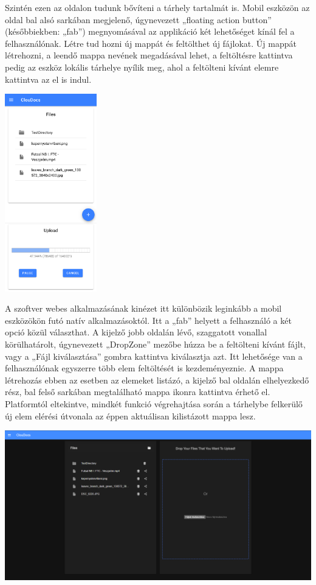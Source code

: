 \documentclass[12pt]{report}
\begin{document}
Szintén ezen az oldalon tudunk bővíteni a tárhely tartalmát is. Mobil eszközön az oldal bal alsó sarkában megjelenő, úgynevezett „floating action button” (későbbiekben: „fab”) megnyomásával az applikáció két lehetőséget kínál fel a felhasználónak. Létre tud hozni új mappát és feltölthet új fájlokat. Új mappát létrehozni, a leendő mappa nevének megadásával lehet, a feltöltésre kattintva pedig az eszköz lokális tárhelye nyílik meg, ahol a feltölteni kívánt elemre kattintva az el is indul.

\begin{center}
	\includegraphics[width=40mm,scale=0.5,]{upload.png}
\end{center}

A szoftver webes alkalmazásának kinézet itt különbözik leginkább a mobil eszközökön futó natív alkalmazásoktól. Itt a „fab” helyett a felhasználó a két opció közül választhat. A kijelző jobb oldalán lévő, szaggatott vonallal körülhatárolt, úgynevezett „DropZone” mezőbe húzza be a feltölteni kívánt fájlt, vagy a „Fájl kiválasztása” gombra kattintva kiválasztja azt. Itt lehetősége van a felhasználónak egyszerre több elem feltöltését is kezdeményeznie. A mappa létrehozás ebben az esetben az elemeket listázó, a kijelző bal oldalán elhelyezkedő rész, bal felső sarkában megtalálható mappa ikonra kattintva érhető el. Platformtól eltekintve, mindkét funkció végrehajtása során a tárhelybe felkerülő új elem elérési útvonala az éppen aktuálisan kilistázott mappa lesz.
\begin{center}
	\includegraphics[width=150mm,scale=0.5,]{files_web.png}
\end{center}
\end{document}
